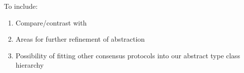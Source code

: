 To include: 
\begin{enumerate} 
	\item Compare/contrast with \cite{Nakamura}
	\item Areas for further refinement of abstraction
	\item Possibility of fitting other consensus protocols into our abstract type class hierarchy
\end{enumerate}